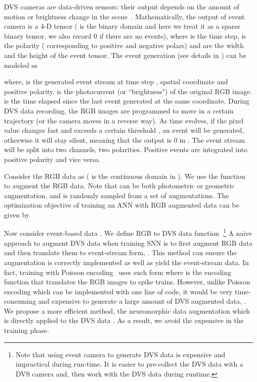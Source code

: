 \documentclass[runningheads]{llncs}
\begin{document}
DVS cameras are data-driven sensors: their output depends on the amount of motion or brightness change in the scene~\cite{gallego2019event}. Mathematically, the output of event camera  is a 4-D tensor ( is the binary domain  and here we treat it as a sparse binary tensor, \ie we also record 0 if there are no events), where  is the time step,  is the polarity ( corresponding to positive and negative polars) and  are the width and the height of the event tensor. The event generation (see details in \cite{gallego2019event}) can be modeled as 
{


}where,  is the generated event stream at time step , spatial coordinate  and positive polarity.  is the photocurrent (or ``brightness") of the original RGB image. 
 is the time elapsed since the last event generated at
the same coordinate.
During DVS data recording, the RGB images are programmed to move in a certain trajectory (or the camera moves in a reverse way). As time evolves, if the pixel value changes fast and exceeds a certain threshold , an event will be generated, otherwise it will stay silent, meaning that the output is 0 in . The event stream will be split into two channels, \ie two polarities. Positive events are integrated into positive polarity and vice versa.

Consider the RGB data as  ( is the continuous domain in ). We use the function  to augment the RGB data. Note that  can be both photometric or geometric augmentation, and is randomly sampled from a set of augmentations. The optimization objective of training an ANN with RGB augmented data can be given by 

Now consider event-based data . We define RGB to DVS data function .\footnote{Note that using event camera  to generate DVS data is expensive and impractical during run-time. It is easier to pre-collect the DVS data with a DVS camera and, then work with the DVS data during runtime.}
A naive approach to augment DVS data when training SNN is to first augment RGB data and then translate them to event-stream form, \ie .
This method can ensure the augmentation is correctly implemented as well as yield the event-stream data. In fact, training with Poisson encoding~\cite{diehl2015fast,roy2019towards} uses such form  where  is the encoding function that translates the RGB images to spike trains.
However, unlike Poisson encoding which can be implemented with one line of code, it would be very time-consuming and expensive to generate a large amount of DVS augmented data, \ie . We propose a more efficient method, the neuromorphic data augmentation  which is directly applied to the DVS data . As a result, we avoid the expensive  in the training phase.
\end{document}
